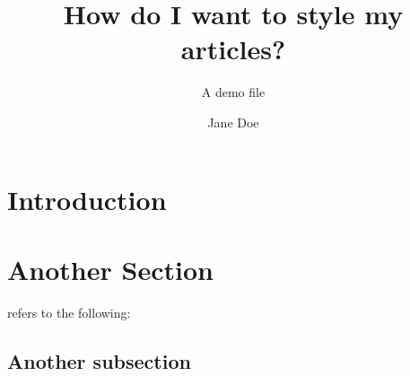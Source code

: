 \documentclass{article}
\title{How do I want to style my articles?}
\subtitle{A demo file}
\author{Jane Doe}
\begin{document}
\maketitle
\startmain

\section{Introduction}
\lipsum[1]
\citep{doe2023example}

\section{Another Section}
\citet{book1} refers to the following: \lipsum[2]

\subsection{Another subsection}
\lipsum[3]



\end{document}

